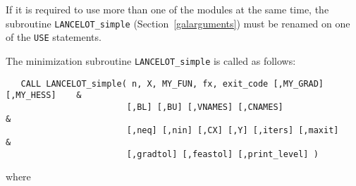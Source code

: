 \documentclass{galahad}
\newcommand{\fullpackagename}{LANC\-E\-LOT\-\_simple}
\begin{document}


\noindent
If it is required to use more than one of the modules at the same time, 
the subroutine
{\tt \fullpackagename}
(Section~\ref{galarguments})
must be renamed on one of the {\tt USE} statements.





\galarguments

The minimization subroutine {\tt LANCELOT\_simple} is called as follows:
\hskip0.5in
\def\baselinestretch{0.8} {\tt \begin{verbatim}
   CALL LANCELOT_simple( n, X, MY_FUN, fx, exit_code [,MY_GRAD] [,MY_HESS]    &
                        [,BL] [,BU] [,VNAMES] [,CNAMES]                       &
                        [,neq] [,nin] [,CX] [,Y] [,iters] [,maxit]            &
                        [,gradtol] [,feastol] [,print_level] )
\end{verbatim}}
\def\baselinestretch{1.0}
\noindent
where
\end{document}
